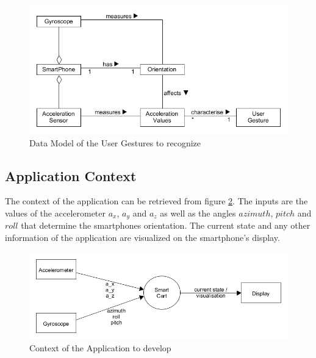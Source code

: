\begin{figure}
\centering
\captionsetup{justification=centering}
\includegraphics[width=\textwidth]{res/sa/UserGestureDataModel.png}
\caption{Data Model of the User Gestures to recognize}
\label{fig:DataModel}
\end{figure}

\subsection{Application Context}
The context of the application can be retrieved from figure \ref{fig:context}.
The inputs are the values of the accelerometer $a_x$, $a_y$ and $a_z$ as well as
the angles $azimuth$, $pitch$ and $roll$ that determine the smartphones
orientation. The current state and any other information of the application are
visualized on the smartphone's display.

\begin{figure}
\centering
\captionsetup{justification=centering}
\includegraphics[width=\textwidth]{res/sa/ContextDiagram.png}
\caption{Context of the Application to develop}
\label{fig:context}
\end{figure}